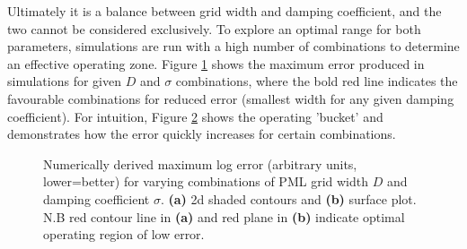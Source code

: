 Ultimately it is a balance between grid width and damping coefficient, and the two cannot be considered exclusively. To explore an optimal range for both parameters, simulations are run with a high number of combinations to determine an effective operating zone. Figure \ref{fig:2DContourSigmaD} shows the maximum error produced in simulations for given $D$ and $\sigma$ combinations, where the bold red line indicates the favourable combinations for reduced error (smallest width for any given damping coefficient). For intuition, Figure \ref{fig:SurfaceSigmaD} shows the operating 'bucket' and demonstrates how the error quickly increases for certain combinations. 



\begin{figure}[h]
    \centering
    \begin{subfigure}[h]{0.49\textwidth}
        \centering
        \caption{}
        \label{fig:2DContourSigmaD}
    \end{subfigure}
    \hfill
    \begin{subfigure}[h]{0.45\textwidth}
        \centering
        \caption{}
        \label{fig:SurfaceSigmaD}
    \end{subfigure}
    \caption{Numerically derived maximum log error (arbitrary units, lower=better) for varying combinations of PML grid width $D$ and damping coefficient $\sigma$. \textbf{(a)} 2d shaded contours and \textbf{(b)} surface plot. N.B red contour line in \textbf{(a)} and red plane in \textbf{(b)} indicate optimal operating region of low error.}
    \label{fig:SigmaDFinal}
\end{figure}

